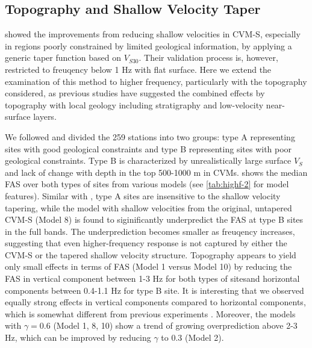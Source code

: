 \subsection{Topography and Shallow Velocity Taper}\label{highf:topoandtaper}
\citet{huCalibrationNearsurfaceSeismic2021} showed the improvements from reducing shallow velocities in CVM-S, especially in regions poorly constrained by limited geological information, by applying a generic taper function based on $V_{S30}$.
Their validation process is, however, restricted to freuqency below 1 Hz with flat surface. Here we extend the examination of this method to higher frequency, particularly with the topography considered, as previous studies have suggested the combined effects by topography with local geology including stratigraphy and low-velocity near-surface layers.

We followed \citet{huCalibrationNearsurfaceSeismic2021} and divided the 259 stations into two groups: type A representing sites with good geological constraints and type B representing sites with poor geological constraints. Type B is characterized by unrealistically large surface $V_S$ and lack of change with depth in the top 500-1000 m in CVMs.  shows the median FAS over both types of sites from various models (see \cref{tab:highf-2} for model features). Similar with \citet{huCalibrationNearsurfaceSeismic2021}, type A sites are insensitive to the shallow velocity tapering, while the model with shallow velocities from the original, untapered CVM-S (Model 8) is found to siginificantly underpredict the FAS at type B sites in the full bands. The underprediction becomes smaller as freuqency increases, suggesting that even higher-frequency response is not captured by either the CVM-S or the tapered shallow velocity structure. Topography appears to yield only small effects in terms of FAS (Model 1 versus Model 10) by reducing the FAS in vertical component between 1-3 Hz for both types of sitesand horizontal components between 0.4-1.1 Hz for type B site. It is interesting that we observed equally strong effects in vertical components compared to horizontal components, which is somewhat different from previous experiments \citep[][and the references therein]{massaOverviewTopographicEffects2014}. Moreover, the models with $\gamma=0.6$ (Model 1, 8, 10) show a trend of growing overprediction above 2-3 Hz, which can be improved by reducing $\gamma$ to 0.3 (Model 2).


